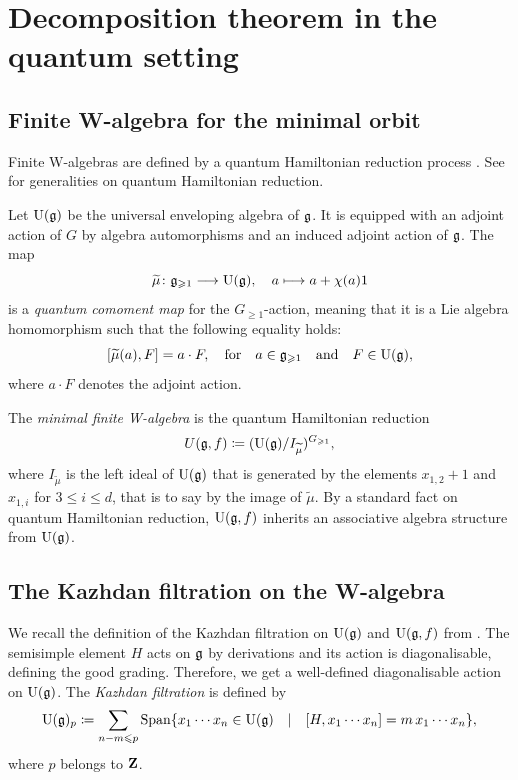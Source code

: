 \section{Decomposition theorem in the quantum setting}
\label{section:quantum-setting}


\subsection{Finite W-algebra for the minimal orbit}

Finite W-algebras are defined by a quantum Hamiltonian reduction process \cite{kostant1978whittaker,premet2002special,gan2002quantization,brundan2007good}. See \cite[Section 7.1]{gan2006almost} for generalities on quantum Hamiltonian reduction.

Let $\mathrm U(\mathfrak g)$ be the universal enveloping algebra of $\mathfrak g$. It is equipped with an adjoint action of $G$ by algebra automorphisms and an induced adjoint action of $\mathfrak g$. The map
\[ \widetilde{\mu} \colon \mathfrak g_{\geqslant 1} \longrightarrow \mathrm U(\mathfrak g), \quad a \longmapsto a + \chi(a) 1 \]
is a \emph{quantum comoment map} for the $G_{\geqslant 1}$-action, meaning that it is a Lie algebra homomorphism such that the following equality holds:
\[ [\widetilde{\mu}(a), F] = a \cdot F, \quad \text{for} \quad a \in \mathfrak g_{\geqslant 1} \quad \text{and} \quad F \in \mathrm U(\mathfrak g), \]
where $a \cdot F$ denotes the adjoint action.

The \emph{minimal finite W-algebra} is the quantum Hamiltonian reduction
\[ U(\mathfrak g, f) \coloneqq (\mathrm U(\mathfrak g) / I_{\widetilde{\mu}})^{G_{\geqslant 1}}, \]
where $I_{\widetilde \mu}$ is the left ideal of $\mathrm U(\mathfrak g)$ that is generated by the elements $x_{1,2} + 1$ and $x_{1,i}$ for $3 \leqslant i \leqslant d$, that is to say by the image of $\widetilde{\mu}$. By a standard fact on quantum Hamiltonian reduction, $\mathrm U(\mathfrak g, f)$ inherits an associative algebra structure from $\mathrm U(\mathfrak g)$.


\subsection{The Kazhdan filtration on the W-algebra} We recall the definition of the Kazhdan filtration on $\mathrm U(\mathfrak g)$ and $\mathrm U(\mathfrak g, f)$ from \cite[Section 4]{gan2002quantization}. The semisimple element $H$ acts on $\mathfrak g$ by derivations and its action is diagonalisable, defining the good grading. Therefore, we get a well-defined diagonalisable action on $\mathrm U(\mathfrak g)$. The \emph{Kazhdan filtration} is defined by
\[ \mathrm U(\mathfrak g)_p \coloneqq \sum_{n - m \leqslant p} \operatorname{Span} \{ x_1 \cdots x_n \in \mathrm U(\mathfrak g) \quad | \quad [H, x_1 \cdots x_n] = m \, x_1 \cdots x_n \}, \]
where $p$ belongs to $\mathbf{Z}$.

